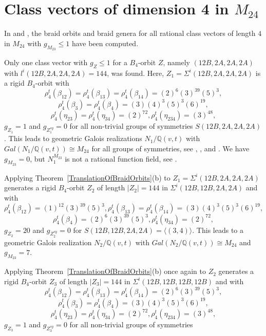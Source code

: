 \documentclass[12pt,a4paper]{article}
\numberwithin{equation}{section}
\numberwithin{table}{section}
\begin{document}
\section{Class vectors of dimension 4 in $M_{24}$}\label{SectionClassVectorsOfDimension4InM24}

In \cite{RefHae1987} and \cite{RefHae1991}, the braid orbits and braid genera for all rational class 
vectors of length $4$ in $M_{24}$ with $g_{M_{23}} \leq 1$ have been computed.
\par
\noindent
Only one class vector with $g_Z \leq 1$ for a $B_4$-orbit $Z$, namely $(12B,2A,2A,2A)$
with $l^i(12B,2A,2A,2A)=144$, was found.
Here, $Z_1 = \Sigma^i(12B,2A,2A,2A)$ is a rigid $B_4$-orbit with
$$\rho^t_4(\beta_{12})=\rho^t_4(\beta_{13})=\rho^t_4(\beta_{14})=(2)^6(3)^{39}(5)^3,$$
$$\rho^t_4(\beta_3)=\rho^t_4(\beta_4)=(3)(4)^3(5)^3(6)^{19},$$
$$\rho^t_4(\eta_{23})=\rho^t_4(\eta_{34})=(2)^{72}, \rho^t_4(\eta_{234})=(3)^{48},$$
$g_{Z_1}=1$ and $g_{Z^{sy}_1}=0$ for all non-trivial groups of symmetries $S(12B,2A,2A,2A)$.
This leads to geometric Galois realizations $N_1/\mathbb{Q}(v,t)$ with $Gal(N_1/\mathbb{Q}(v,t)) \cong M_{24}$
for all groups of symmetries, see
\cite[Nachtrag]{RefHae1987}, \cite[Beispiel 1.1]{RefHae1991}, \cite[Satz 9.4]{RefMat1991}
and \cite[III, Theorem 7.12]{RefMM2018}.
We have $g_{M_{23}}=0$, but $N^{M_{23}}_1$ is not a rational function field, see \cite{RefGra1996}.
\par
\noindent
Applying Theorem~\ref{TranslationOfBraidOrbits}(b) to $Z_1 = \Sigma^i(12B,2A,2A,2A)$ generates a rigid $B_4$-orbit $Z_2$
of length $ \vert Z_2 \vert =144$ in $\Sigma^i(12B,12B,2A,2A)$ and with
$$\rho^t_4(\beta_{12})=(1)^{12}(3)^{39}(5)^3, \rho^t_4(\beta_{13})=\rho^t_4(\beta_{14})=(3)(4)^3(5)^3(6)^{19},$$
$$\rho^t_4(\beta_4)=(2)^6(3)^{39}(5)^3, \rho^t_4(\eta_{34})=(2)^{72},$$
$g_{Z_2}=20$ and $g_{Z^{sy}_2}=0$ for $S(12B,12B,2A,2A) = \langle (3,4) \rangle$.
This leads to a geometric Galois realization
$N_2/\mathbb{Q}(v,t)$ with $Gal(N_2/\mathbb{Q}(v,t)) \cong M_{24}$ and $g_{M_{23}}=7$.
\par
\noindent
Applying Theorem~\ref{TranslationOfBraidOrbits}(b) once again to $Z_2$ generates a rigid 
$B_4$-orbit $Z_3$ of length $ \vert Z_3 \vert =144$ in $\Sigma^i(12B,12B,12B,12B)$ and with
$$\rho^t_4(\beta_{12})=\rho^t_4(\beta_{13})=\rho^t_4(\beta_{14})=(2)^6(3)^{39}(5)^3,$$
$$\rho^t_4(\beta_3)=\rho^t_4(\beta_4)=(3)(4)^3(5)^3(6)^{19},$$
$$\rho^t_4(\eta_{23})=\rho^t_4(\eta_{34})=(2)^{72}, \rho^t_4(\eta_{234})=(3)^{48},$$
$g_{Z_3}=1$ and $g_{Z^{sy}_3}=0$ for all non-trivial groups of symmetries
\end{document}
